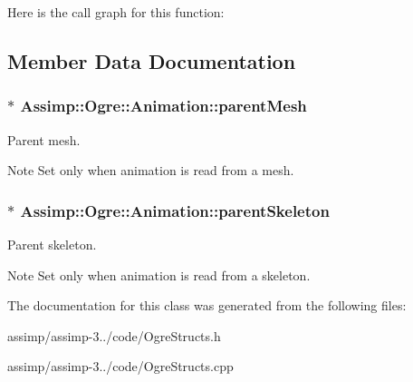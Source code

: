 Here is the call graph for this function\+:




\subsection{Member Data Documentation}
\hypertarget{class_assimp_1_1_ogre_1_1_animation_a8c9079997866ec4b2aefa1ff2a6320e3}{
\subsubsection[{parent\+Mesh}]{$\ast$ Assimp\+::\+Ogre\+::\+Animation\+::parent\+Mesh}}\label{class_assimp_1_1_ogre_1_1_animation_a8c9079997866ec4b2aefa1ff2a6320e3}


Parent mesh. 

\begin{DoxyNote}{Note}
Set only when animation is read from a mesh. 
\end{DoxyNote}
\hypertarget{class_assimp_1_1_ogre_1_1_animation_a0ada724d3d870045f3400c7aeee4c232}{
\subsubsection[{parent\+Skeleton}]{$\ast$ Assimp\+::\+Ogre\+::\+Animation\+::parent\+Skeleton}}\label{class_assimp_1_1_ogre_1_1_animation_a0ada724d3d870045f3400c7aeee4c232}


Parent skeleton. 

\begin{DoxyNote}{Note}
Set only when animation is read from a skeleton. 
\end{DoxyNote}


The documentation for this class was generated from the following files\+:\begin{DoxyCompactItemize}
\item 
assimp/assimp-\/3../code/Ogre\+Structs.\+h\item 
assimp/assimp-\/3../code/Ogre\+Structs.\+cpp\end{DoxyCompactItemize}
